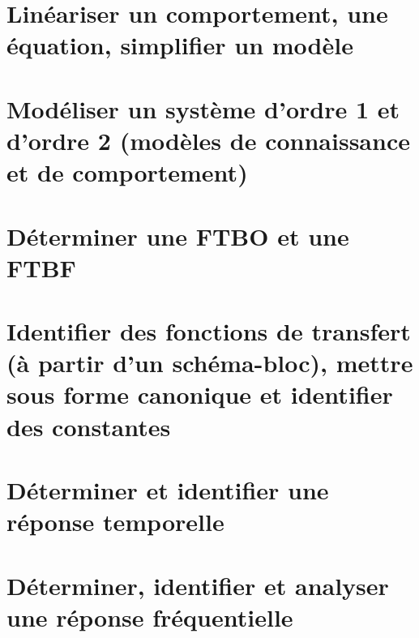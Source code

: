 \section{Linéariser un comportement, une équation, simplifier un modèle} 
\section{Modéliser un système d'ordre 1 et d'ordre 2  (modèles de connaissance et de comportement)} 
\graphicspath{{\repStyle/png/}{../SLCI/SLCI-07-Ordre12/502_Divers/images/}} 
 
 
\graphicspath{{\repStyle/png/}{../SLCI/SLCI-07-Ordre12/503_Divers/images/}} 
 
 
\graphicspath{{\repStyle/png/}{../SLCI/SLCI-07-Ordre12/504_Divers/images/}} 
 
 
\graphicspath{{\repStyle/png/}{../SLCI/SLCI-07-Ordre12/506_Divers/images/}} 
 
 
\section{Déterminer une FTBO et une FTBF} 
\section{Identifier des fonctions de transfert (à partir d'un schéma-bloc), mettre sous forme canonique et identifier des constantes} 
\section{Déterminer et identifier une réponse temporelle} 
\section{Déterminer, identifier et analyser une réponse fréquentielle} 
\graphicspath{{\repStyle/png/}{../SLCI/SLCI-11-DiagrammeBode/510_01_Divers/images/}} 
 
 
\graphicspath{{\repStyle/png/}{../SLCI/SLCI-11-DiagrammeBode/510_02_Divers/images/}} 
 
 
\graphicspath{{\repStyle/png/}{../SLCI/SLCI-11-DiagrammeBode/510_03_Divers/images/}} 
 
 
